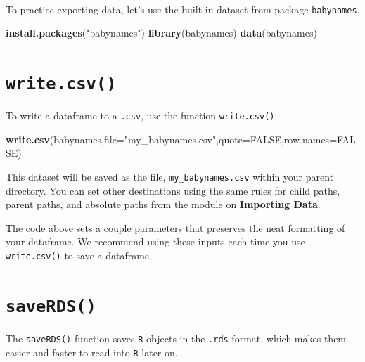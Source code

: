 \documentclass[
]{book}
\newenvironment{Shaded}{\begin{snugshade}}{\end{snugshade}}
\newcommand{\DataTypeTok}[1]{\textcolor[rgb]{0.13,0.29,0.53}{#1}}
\newcommand{\KeywordTok}[1]{\textcolor[rgb]{0.13,0.29,0.53}{\textbf{#1}}}
\newcommand{\NormalTok}[1]{#1}
\newcommand{\OtherTok}[1]{\textcolor[rgb]{0.56,0.35,0.01}{#1}}
\newcommand{\StringTok}[1]{\textcolor[rgb]{0.31,0.60,0.02}{#1}}
\begin{document}
~

To practice exporting data, let's use the built-in dataset from package \texttt{babynames}.

\begin{Shaded}
\begin{Highlighting}[]
\KeywordTok{install.packages}\NormalTok{(}\StringTok{"babynames"}\NormalTok{)}
\KeywordTok{library}\NormalTok{(babynames)}
\KeywordTok{data}\NormalTok{(babynames)}
\end{Highlighting}
\end{Shaded}

\hypertarget{write.csv}{%
\section*{\texorpdfstring{\texttt{write.csv()}}{write.csv()}}\label{write.csv}}

To write a dataframe to a \texttt{.csv}, use the function \texttt{write.csv()}.

\begin{Shaded}
\begin{Highlighting}[]
\KeywordTok{write.csv}\NormalTok{(babynames,}\DataTypeTok{file=}\StringTok{"my_babynames.csv"}\NormalTok{,}\DataTypeTok{quote=}\OtherTok{FALSE}\NormalTok{,}\DataTypeTok{row.names=}\OtherTok{FALSE}\NormalTok{)}
\end{Highlighting}
\end{Shaded}

This dataset will be saved as the file, \texttt{my\_babynames.csv} within your parent directory. You can set other destinations using the same rules for child paths, parent paths, and absolute paths from the module on \textbf{Importing Data}.

The code above sets a couple parameters that preserves the neat formatting of your dataframe. We recommend using these inputs each time you use \texttt{write.csv()} to save a dataframe.

\hypertarget{saverds}{%
\section*{\texorpdfstring{\texttt{saveRDS()}}{saveRDS()}}\label{saverds}}

The \texttt{saveRDS()} function saves \texttt{R} objects in the \texttt{.rds} format, which makes them easier and faster to read into \texttt{R} later on.
\end{document}
